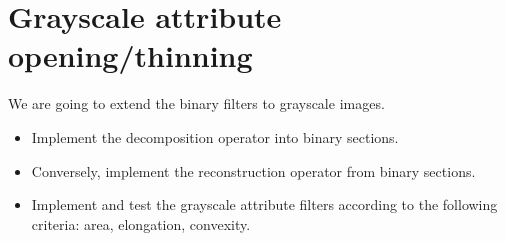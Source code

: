 \section{Grayscale attribute opening/thinning}\vspace*{-6pt}
We are going to extend the binary filters to grayscale images.
\begin{qbox}
\begin{itemize}
	\item Implement the decomposition operator into binary sections.
	\item Conversely, implement the reconstruction operator from binary sections.
	\item Implement and test the grayscale attribute filters according to the following criteria: area, elongation, convexity.
\end{itemize}
\end{qbox}


